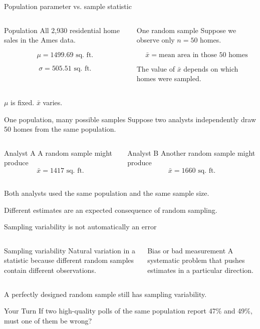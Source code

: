 \documentclass[11pt,aspectratio=169]{beamer}
\newcommand{\yourturn}[1]{%
\begin{center}
\begin{minipage}{0.90\textwidth}
\begin{alertblock}{Your Turn}
#1
\end{alertblock}
\end{minipage}
\end{center}}
\begin{document}
\begin{frame}{Population parameter vs. sample statistic}
\begin{columns}[T,onlytextwidth]
\begin{block}{Population}
All 2,930 residential home sales in the Ames data.

\[
\mu = 1499.69\text{ sq. ft.}
\]

\[
\sigma = 505.51\text{ sq. ft.}
\]
\end{block}
\begin{block}{One random sample}
Suppose we observe only $n=50$ homes.

\[
\bar{x}=\text{mean area in those 50 homes}
\]

The value of $\bar{x}$ depends on which homes were sampled.
\end{block}
\end{columns}

\vfill
\alert{$\mu$ is fixed. $\bar{x}$ varies.}
\end{frame}

\begin{frame}{One population, many possible samples}
Suppose two analysts independently draw 50 homes from the same population.

\begin{columns}[T,onlytextwidth]
\begin{block}{Analyst A}
A random sample might produce
\[
\bar{x}=1417\text{ sq. ft.}
\]
\end{block}
\begin{block}{Analyst B}
Another random sample might produce
\[
\bar{x}=1660\text{ sq. ft.}
\]
\end{block}
\end{columns}

\vspace{0.8em}
Both analysts used the same population and the same sample size.

\vfill
\alert{Different estimates are an expected consequence of random sampling.}
\end{frame}

\begin{frame}{Sampling variability is not automatically an error}
\begin{columns}[T,onlytextwidth]
\begin{block}{Sampling variability}
Natural variation in a statistic because different random samples contain different observations.
\end{block}
\begin{block}{Bias or bad measurement}
A systematic problem that pushes estimates in a particular direction.
\end{block}
\end{columns}

\vspace{0.8em}
A perfectly designed random sample still has sampling variability.

\vfill
\yourturn{If two high-quality polls of the same population report 47\% and 49\%, must one of them be wrong?}
\end{frame}
\end{document}
